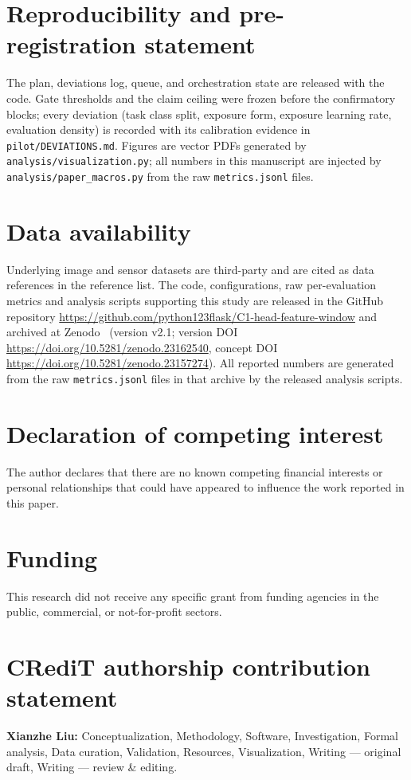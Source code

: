 \documentclass[review,12pt]{elsarticle}
\begin{document}
\section*{Reproducibility and pre-registration statement}
The plan, deviations log, queue, and orchestration state are released with the
code. Gate thresholds and the claim ceiling were frozen before the
confirmatory blocks; every deviation (task class split, exposure form, exposure
learning rate, evaluation density) is recorded with its calibration evidence in
\texttt{pilot/DEVIATIONS.md}. Figures are vector PDFs generated by
\texttt{analysis/visualization.py}; all numbers in this manuscript are injected
by \texttt{analysis/paper_macros.py} from the raw \texttt{metrics.jsonl} files.

\section*{Data availability}\begingroup\sloppy
Underlying image and sensor datasets are third-party and are cited as data
references in the reference list. The code, configurations, raw per-evaluation
metrics and analysis scripts supporting this study are released in the GitHub
repository \url{https://github.com/python123flask/C1-head-feature-window} and
archived at Zenodo~\cite{xliu2026c1release} (version v2.1; version DOI
\url{https://doi.org/10.5281/zenodo.23162540}, concept DOI
\url{https://doi.org/10.5281/zenodo.23157274}). All reported numbers are
generated from the raw \texttt{metrics.jsonl} files in that archive by the
released analysis scripts.
\endgroup

\section*{Declaration of competing interest}
The author declares that there are no known competing financial interests or
personal relationships that could have appeared to influence the work reported
in this paper.

\section*{Funding}
This research did not receive any specific grant from funding agencies in the
public, commercial, or not-for-profit sectors.

\section*{CRediT authorship contribution statement}
\textbf{Xianzhe Liu:} Conceptualization, Methodology, Software, Investigation,
Formal analysis, Data curation, Validation, Resources, Visualization,
Writing --- original draft, Writing --- review \& editing.
\end{document}
